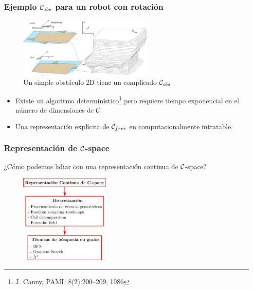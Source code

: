 \begin{frame}
	\frametitle{Ejemplo $\mathcal{C}_{obs}$ para un robot con rotación}
	
	\begin{figure}[!h]
		\includegraphics[width=0.6\textwidth]{images/cspace_representation_motivation.pdf}
		\caption{Un simple obstáculo 2D tiene un complicado $\mathcal{C}_{obs}$}
	\end{figure}

	\begin{itemize}
		\item Existe un algoritmo determinístico\footnote{J. Canny, PAMI, 8(2):200–209, 1986} pero requiere tiempo exponencial en el número de dimensiones de $\mathcal{C}$
		\item Una representación explícita de $\mathcal{C}_{free}$ en computacionalmente intratable.
	\end{itemize}
\end{frame}

\begin{frame}
	\frametitle{Representación de $\mathcal{C}$-space}
	
	¿Cómo podemos lidiar con una representación continua de $\mathcal{C}$-space?
	
	\begin{figure}[!h]
		\includegraphics[width=0.4\textwidth]{images/cspace_representation.pdf}
	\end{figure}
	
\end{frame}


